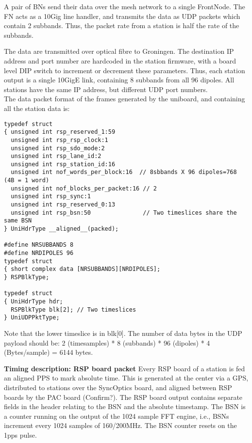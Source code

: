 \documentclass {article}
\begin{document}
A pair of BNs send their data over the mesh network to a single FrontNode. The
FN acts as a  10Gig line handler, and transmits the data  as UDP packets which
contain 2 subbands. Thus,  the packet rate from a station is  half the rate of
the subbands.

The data  are transmitted  over optical fibre  to Groningen. The  destination IP
address and  port number  are hardcoded  in the station  firmware, with  a board
level DIP switch to increment  or decrement these parameters. Thus, each station
output is a  single 10GigE link, containing 8 subbands from  all 96 dipoles. All
stations have the same IP address, but different UDP port numbers.\\

The data packet  format of the frames generated by  the uniboard, and containing
all the station data is:
\begin{lstlisting}
typedef struct
{ unsigned int rsp_reserved_1:59
  unsigned int rsp_rsp_clock:1
  unsigned int rsp_sdo_mode:2
  unsigned int rsp_lane_id:2
  unsigned int rsp_station_id:16
  unsigned int nof_words_per_block:16  // 8sbbands X 96 dipoles=768 (4B = 1 word)
  unsigned int nof_blocks_per_packet:16 // 2
  unsigned int rsp_sync:1
  unsigned int rsp_reserved_0:13
  unsigned int rsp_bsn:50               // Two timeslices share the same BSN
} UniHdrType __aligned__(packed);

#define NRSUBBANDS 8
#define NRDIPOLES 96
typedef struct
{ short complex data [NRSUBBANDS][NRDIPOLES];
} RSPBlkType;

typedef struct
{ UniHdrType hdr;
  RSPBlkType blk[2]; // Two timeslices 
} UniUDPPktType;

\end{lstlisting}

Note that the lower timeslice is in  blk[0]. The number of data bytes in the UDP
payload  should  be:  2  (timesamples) * 8  (subbands) * 96  (dipoles)  *  4
(Bytes/sample) = 6144 bytes.


\textbf {Timing description:  RSP board packet} Every RSP board  of a station is
fed an aligned PPS to mark absolute  time. This is generated at the center via a
GPS, distributed to stations over  the SyncOptics board, and aligned between RSP
boards  by the  PAC board  (Confirm?). The  RSP board  output  contains separate
fields in the header relating to the  BSN and the absolute timestamp. The BSN is
a  counter running  on the  output of  the 1024  sample FFT  engine,  i.e., BSNs
increment every 1024  samples of 160/200MHz. The BSN counter  resets on the 1pps
pulse. 
\end{document}
